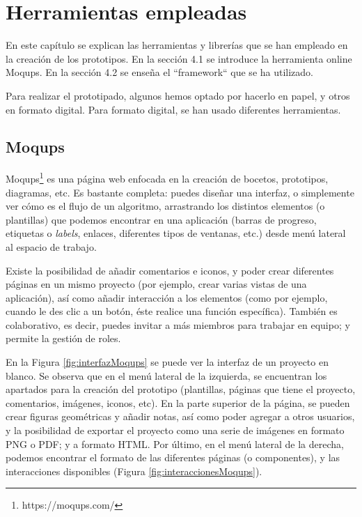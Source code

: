 %
%
\setlength{\parskip}{\baselineskip}

\chapter{Herramientas empleadas}

\begin{resumen}
	
	En este cap\'itulo se explican las herramientas y librer\'ias que se han empleado en la creaci\'on de los prototipos. En la secci\'on 4.1 se introduce la herramienta online Moqups. En la secci\'on 4.2 se ense\~{n}a el ``framework`` que se ha utilizado.
	
\end{resumen}
	
	Para realizar el prototipado, algunos hemos optado por hacerlo en papel, y otros en formato digital. Para formato digital, se han usado diferentes herramientas.
	
\section{Moqups}
\label{cap4:sec:moqups}

	Moqups\footnote{https://moqups.com/} es una p\'agina web enfocada en la creaci\'on de bocetos, prototipos, diagramas, etc. Es bastante completa: puedes dise\~{n}ar una interfaz, o simplemente ver c\'omo es el flujo de un algoritmo, arrastrando los distintos elementos (o plantillas) que podemos encontrar en una aplicaci\'on (barras de progreso, etiquetas o \textit{labels}, enlaces, diferentes tipos de ventanas, etc.) desde men\'u lateral al espacio de trabajo. 
	
	Existe la posibilidad de a\~{n}adir comentarios e iconos, y poder crear diferentes p\'aginas en un mismo proyecto (por ejemplo, crear varias vistas de una aplicaci\'on), as\'i como a\~{n}adir interacci\'on a los elementos (como por ejemplo, cuando le des clic a un bot\'on, \'este realice una funci\'on espec\'ifica). Tambi\'en es colaborativo, es decir, puedes invitar a m\'as miembros para trabajar en equipo; y permite la gesti\'on de roles.
	
	En la Figura \ref{fig:interfazMoqups} se puede ver la interfaz de un proyecto en blanco. Se observa que en el men\'u lateral de la izquierda, se encuentran los apartados para la creaci\'on del prototipo (plantillas, p\'aginas que tiene el proyecto, comentarios, im\'agenes, iconos, etc). En la parte superior de la p\'agina, se pueden crear figuras geom\'etricas y a\~{n}adir notas, as\'i como poder agregar a otros usuarios, y la posibilidad de exportar el proyecto como una serie de im\'agenes en formato PNG o PDF; y a formato HTML. Por \'ultimo, en el men\'u lateral de la derecha, podemos encontrar el formato de las diferentes p\'aginas (o componentes), y las interacciones disponibles (Figura \ref{fig:interaccionesMoqups}).
	
